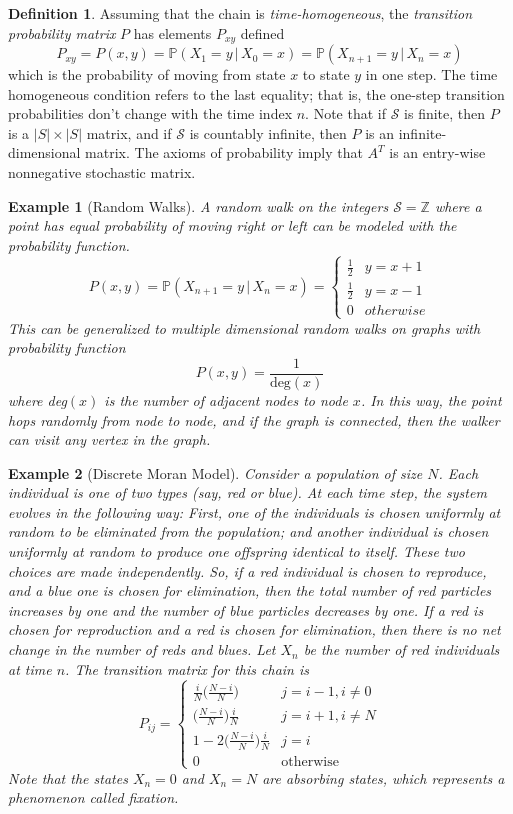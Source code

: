 \documentclass{article}
\newtheorem{example}{Example}[section]
\theoremstyle{remark}
\theoremstyle{definition}
\newtheorem{definition}{Definition}[section]
\begin{document}
\begin{definition}
Assuming that the chain is \textit{time-homogeneous}, the \textit{transition probability matrix} $P$ has elements $P_{x y}$ defined
\[P_{x y} = P(x, y) = \mathbb{P}(X_1 = y \,|\, X_0 = x) = \mathbb{P}(X_{n+1} = y \,|\, X_n = x)\]
which is the probability of moving from state $x$ to state $y$ in one step. The time homogeneous condition refers to the last equality; that is, the one-step transition probabilities don't change with the time index $n$. Note that if $\mathcal{S}$ is finite, then $P$ is a $|S| \times |S|$ matrix, and if $\mathcal{S}$ is countably infinite, then $P$ is an infinite-dimensional matrix. The axioms of probability imply that $A^T$ is an entry-wise nonnegative stochastic matrix.
\end{definition}

\begin{example}[Random Walks]
A \textit{random walk} on the integers $\mathcal{S} = \mathbb{Z}$ where a point has equal probability of moving right or left can be modeled with the probability function. 
\[P(x, y) = \mathbb{P}(X_{n+1} = y \, | \, X_n = x) = \begin{cases}
\frac{1}{2} & y = x + 1 \\
\frac{1}{2} & y = x - 1\\
0 & otherwise
\end{cases}\]
This can be generalized to multiple dimensional random walks on graphs with probability function 
\[P(x, y) = \frac{1}{\text{deg}(x)}\]
where deg$(x)$ is the number of adjacent nodes to node $x$. In this way, the point hops randomly from node to node, and if the graph is connected, then the walker can visit any vertex in the graph. 
\end{example}

\begin{example}[Discrete Moran Model]
Consider a population of size $N$. Each individual is one of two types (say, red or blue). At each time step, the system evolves in the following way: First, one of the individuals is chosen uniformly at random to be eliminated from the population; and another individual is chosen uniformly at random to produce one offspring identical to itself. These two choices are made independently. So, if a red individual is chosen to reproduce, and a blue one is chosen for elimination, then the total number of red particles increases by one and the number of blue particles decreases by one. If a red is chosen for reproduction and a red is chosen for elimination, then there is no net change in the number of reds and blues. Let $X_n$ be the number of red individuals at time $n$. The transition matrix for this chain is
\[P_{i j} = \begin{cases}
\frac{i}{N} \bigg(\frac{N-i}{N} \bigg) & j=i-1, i \neq 0 \\
\bigg(\frac{N-i}{N} \bigg) \frac{i}{N} & j=i+1, i \neq N \\
1 - 2 \bigg(\frac{N-i}{N} \bigg) \frac{i}{N} & j = i \\
0 & \text{otherwise}
\end{cases}\]
Note that the states $X_n = 0$ and $X_n = N$ are absorbing states, which represents a phenomenon called \textit{fixation}. 
\end{example}
\end{document}
